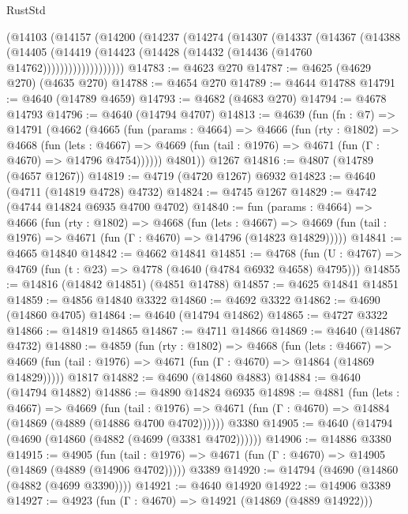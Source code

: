 \begin{lexlean}{RustStd}
\begin{coremodule}
          (@14103
            (@14157
              (@14200
                (@14237
                  (@14274
                    (@14307
                      (@14337
                        (@14367
                          (@14388
                            (@14405
                              (@14419
                                (@14423 (@14428 (@14432 (@14436 (@14760 @14762)))))))))))))))))))
@14783 := @4623 @270
@14787 := @4625 (@4629 @270) (@4635 @270)
@14788 := @4654 @270
@14789 := @4644 @14788
@14791 := @4640 (@14789 @4659)
@14793 := @4682 (@4683 @270)
@14794 := @4678 @14793
@14796 := @4640 (@14794 @4707)
@14813 := @4639
    (fun (fn : @7) =>
    @14791
      (@4662
        (@4665
          (fun (params : @4664) =>
          @4666
            (fun (rty : @1802) =>
            @4668
              (fun (lets : @4667) =>
              @4669 (fun (tail : @1976) => @4671 (fun (Γ : @4670) => @14796 @4754))))))
        @4801))
    @1267
@14816 := @4807 (@14789 (@4657 @1267))
@14819 := @4719 (@4720 @1267) @6932
@14823 := @4640 (@4711 (@14819 @4728) @4732)
@14824 := @4745 @1267
@14829 := @4742 (@4744 @14824 @6935 @4700 @4702)
@14840 := fun (params : @4664) =>
  @4666
    (fun (rty : @1802) =>
    @4668
      (fun (lets : @4667) =>
      @4669 (fun (tail : @1976) => @4671 (fun (Γ : @4670) => @14796 (@14823 @14829)))))
@14841 := @4665 @14840
@14842 := @4662 @14841
@14851 := @4768
    (fun (U : @4767) => @4769 (fun (t : @23) => @4778 (@4640 (@4784 @6932 @4658) @4795)))
@14855 := @14816 (@14842 @14851) (@4851 @14788)
@14857 := @4625 @14841 @14851
@14859 := @4856 @14840 @3322
@14860 := @4692 @3322
@14862 := @4690 (@14860 @4705)
@14864 := @4640 (@14794 @14862)
@14865 := @4727 @3322
@14866 := @14819 @14865
@14867 := @4711 @14866
@14869 := @4640 (@14867 @4732)
@14880 := @4859
    (fun (rty : @1802) =>
    @4668
      (fun (lets : @4667) =>
      @4669 (fun (tail : @1976) => @4671 (fun (Γ : @4670) => @14864 (@14869 @14829)))))
    @1817
@14882 := @4690 (@14860 @4883)
@14884 := @4640 (@14794 @14882)
@14886 := @4890 @14824 @6935
@14898 := @4881
    (fun (lets : @4667) =>
    @4669
      (fun (tail : @1976) =>
      @4671 (fun (Γ : @4670) => @14884 (@14869 (@4889 (@14886 @4700 @4702))))))
    @3380
@14905 := @4640 (@14794 (@4690 (@14860 (@4882 (@4699 (@3381 @4702))))))
@14906 := @14886 @3380
@14915 := @4905
    (fun (tail : @1976) => @4671 (fun (Γ : @4670) => @14905 (@14869 (@4889 (@14906 @4702)))))
    @3389
@14920 := @14794 (@4690 (@14860 (@4882 (@4699 @3390))))
@14921 := @4640 @14920
@14922 := @14906 @3389
@14927 := @4923 (fun (Γ : @4670) => @14921 (@14869 (@4889 @14922)))

\end{coremodule}
\end{lexlean}
